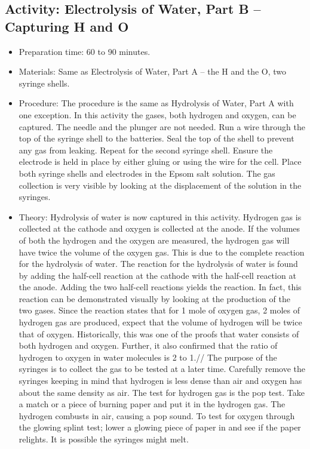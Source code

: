 \begin{itemize}
{\begin{itemize}
\subsection{Activity: Electrolysis of Water, Part B – Capturing H and O}
\begin{itemize}
\item{Preparation time: 60 to 90 minutes. }
\item{Materials: Same as Electrolysis of Water, Part A – the H and the O, two syringe shells.}
\item{Procedure: The procedure is the same as Hydrolysis of Water, Part A with one exception. In this activity the gases, both hydrogen and oxygen, can be captured. The needle and the plunger are not needed. Run a wire through the top of the syringe shell to the batteries. Seal the top of the shell to prevent any gas from leaking. Repeat for the second syringe shell. Ensure the electrode is held in place by either gluing or using the wire for the cell. Place both syringe shells and electrodes in the Epsom salt solution. The gas collection is very visible by looking at the displacement of the solution in the syringes. }
\item{Theory: Hydrolysis of water is now captured in this activity. Hydrogen gas is collected at the cathode and oxygen is collected at the anode. If the volumes of both the hydrogen and the oxygen are measured, the hydrogen gas will have twice the volume of the oxygen gas. This is due to the complete reaction for the hydrolysis of water. The reaction for the hydrolysis of water is found by adding the half-cell reaction at the cathode with the half-cell reaction at the anode. Adding the two half-cell reactions yields the reaction. In fact, this reaction can be demonstrated visually by looking at the production of the two gases. Since the reaction states that for 1 mole of oxygen gas, 2 moles of hydrogen gas are produced, expect that the volume of hydrogen will be twice that of oxygen. Historically, this was one of the proofs that water consists of both hydrogen and oxygen. Further, it also confirmed that the ratio of hydrogen to oxygen in water molecules is 2 to 1.//
The purpose of the syringes is to collect the gas to be tested at a later time. Carefully remove the syringes keeping in mind that hydrogen is less dense than air and oxygen has about the same density as air. The test for hydrogen gas is the pop test. Take a match or a piece of burning paper and put it in the hydrogen gas. The hydrogen combusts in air, causing a pop sound. To test for oxygen through the glowing splint test; lower a glowing piece of paper in and see if the paper relights. It is possible the syringes might melt. }
\end{itemize}


\end{itemize}}
\end{itemize}
